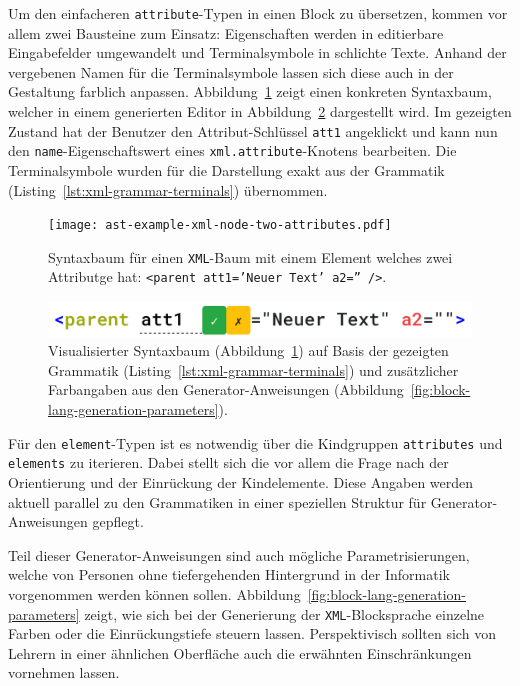 \documentclass[paper=a4,fontsize=11pt,parskip=half]{scrartcl}
\begin{document}
Um den einfacheren \texttt{attribute}-Typen in einen Block zu übersetzen, kommen vor allem zwei Bausteine zum Einsatz: Eigenschaften werden in editierbare Eingabefelder umgewandelt und Terminalsymbole in schlichte Texte. Anhand der vergebenen Namen für die Terminalsymbole lassen sich diese auch in der Gestaltung farblich anpassen. Abbildung~\ref{fig:ast-example-xml-node-two-attributes} zeigt einen konkreten Syntaxbaum, welcher in einem generierten Editor in Abbildung~\ref{fig:example-xml-generated} dargestellt wird. Im gezeigten Zustand hat der Benutzer den Attribut-Schlüssel \texttt{att1} angeklickt und kann nun den \texttt{name}-Eigenschaftswert eines \texttt{xml.attribute}-Knotens bearbeiten. Die Terminalsymbole wurden für die Darstellung exakt aus der Grammatik (Listing~\ref{lst:xml-grammar-terminals}) übernommen.

\begin{figure}[h]
  \centering\texttt{[image: ast-example-xml-node-two-attributes.pdf]}
  \caption{Syntaxbaum für einen \texttt{XML}-Baum mit einem Element welches zwei Attributge hat: \texttt{<parent att1='Neuer Text' a2='' />}.}
  \label{fig:ast-example-xml-node-two-attributes}
\end{figure}

\begin{figure}[h]
  \centering\includegraphics[width=\linewidth]{screenshot-generated-xml.png}
  \caption{Visualisierter Syntaxbaum (Abbildung~\ref{fig:ast-example-xml-node-two-attributes}) auf Basis der gezeigten Grammatik (Listing~\ref{lst:xml-grammar-terminals}) und zusätzlicher Farbangaben aus den Generator-Anweisungen (Abbildung~\ref{fig:block-lang-generation-parameters}).}
  \label{fig:example-xml-generated}
\end{figure}

Für den \texttt{element}-Typen ist es notwendig über die Kindgruppen \texttt{attributes} und \texttt{elements} zu iterieren. Dabei stellt sich die vor allem die Frage nach der Orientierung und der Einrückung der Kindelemente. Diese Angaben werden aktuell parallel zu den Grammatiken in einer speziellen Struktur für Generator-Anweisungen gepflegt.

Teil dieser Generator-Anweisungen sind auch mögliche Parametrisierungen, welche von Personen ohne tiefergehenden Hintergrund in der Informatik vorgenommen werden können sollen. Abbildung~\ref{fig:block-lang-generation-parameters} zeigt, wie sich bei der Generierung der \texttt{XML}-Blocksprache einzelne Farben oder die Einrückungstiefe steuern lassen. Perspektivisch sollten sich von Lehrern in einer ähnlichen Oberfläche auch die erwähnten Einschränkungen vornehmen lassen.
\end{document}

